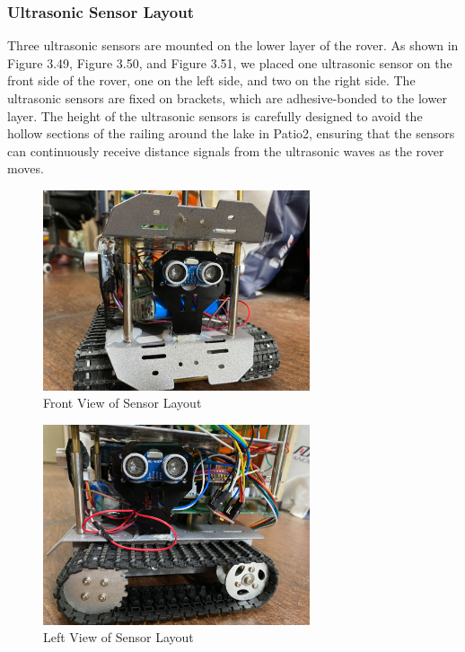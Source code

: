 \documentclass[12pt, a4paper, oneside]{report}
\begin{document}
\subsubsection{Ultrasonic Sensor Layout}
Three ultrasonic sensors are mounted on the lower layer of the rover. As shown in Figure 3.49, Figure 3.50, and Figure 3.51, we placed one ultrasonic sensor on the front side of the rover, one on the left side, and two on the right side. The ultrasonic sensors are fixed on brackets, which are adhesive-bonded to the lower layer. The height of the ultrasonic sensors is carefully designed to avoid the hollow sections of the railing around the lake in Patio2, ensuring that the sensors can continuously receive distance signals from the ultrasonic waves as the rover moves.
\begin{figure}[H]
  \centering
  \includegraphics[width=0.7\textwidth]{pic/HC-SR04/front view.jpg}
  \caption{Front View of Sensor Layout}
  \label{fig:Front View of Sensor Layout}
\end{figure}
\begin{figure}[H]
  \centering
  \includegraphics[width=0.7\textwidth]{pic/HC-SR04/left view.jpg}
  \caption{Left View of Sensor Layout}
  \label{fig:Left View of Sensor Layout}
\end{figure}
\end{document}
